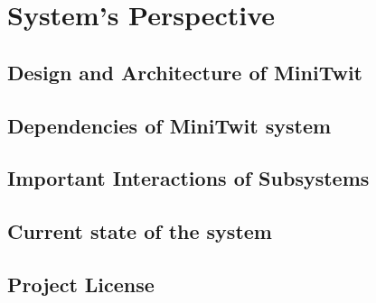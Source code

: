 \section{System's Perspective}

\subsection{Design and Architecture of MiniTwit}

\subsection{Dependencies of MiniTwit system}

\subsection{Important Interactions of Subsystems}

\subsection{Current state of the system}

\subsection{Project License}